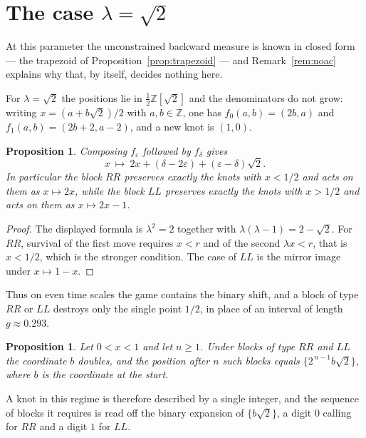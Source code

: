 \documentclass[11pt,reqno]{amsart}
\theoremstyle{plain}
\newtheorem{proposition}[theorem]{Proposition}
\theoremstyle{definition}
\theoremstyle{remark}
\newcommand{\Z}{\mathbb{Z}}
\newcommand{\fp}[1]{\{#1\}}
\begin{document}
\section{\texorpdfstring{The case $\lambda=\sqrt2$}{The case lambda = sqrt 2}}\label{sec:sqrt2}

At this parameter the unconstrained backward measure is known in closed form
--- the trapezoid of Proposition~\ref{prop:trapezoid} --- and
Remark~\ref{rem:noac} explains why that, by itself, decides nothing here.

For $\lambda=\sqrt2$ the positions lie in $\tfrac12\Z[\sqrt2]$ and the
denominators do not grow: writing $x=(a+b\sqrt2)/2$ with $a,b\in\Z$, one has
$f_0(a,b)=(2b,a)$ and $f_1(a,b)=(2b+2,a-2)$, and a new knot is $(1,0)$.

\begin{proposition}\label{prop:blocks}
Composing $f_\varepsilon$ followed by $f_\delta$ gives
\[
  x\ \longmapsto\ 2x+(\delta-2\varepsilon)+(\varepsilon-\delta)\sqrt2 .
\]
In particular the block $RR$ preserves exactly the knots with $x<1/2$ and acts
on them as $x\mapsto2x$, while the block $LL$ preserves exactly the knots with
$x>1/2$ and acts on them as $x\mapsto2x-1$.
\end{proposition}

\begin{proof}
The displayed formula is $\lambda^2=2$ together with
$\lambda(\lambda-1)=2-\sqrt2$. For $RR$, survival of the first move requires
$x<r$ and of the second $\lambda x<r$, that is $x<1/2$, which is the stronger
condition. The case of $LL$ is the mirror image under $x\mapsto1-x$.
\end{proof}

Thus on even time scales the game contains the binary shift, and a block of type
$RR$ or $LL$ destroys only the single point $1/2$, in place of an interval of
length $g\approx0.293$.

\begin{proposition}\label{prop:closed}
Let $0<x<1$ and let $n\geq1$. Under blocks of type $RR$ and $LL$ the coordinate
$b$ doubles, and the position after $n$ such blocks equals
$\fp{2^{\,n-1}b\sqrt2}$, where $b$ is the coordinate at the start.
\end{proposition}

A knot in this regime is therefore described by a single integer, and the
sequence of blocks it requires is read off the binary expansion of
$\fp{b\sqrt2}$, a digit $0$ calling for $RR$ and a digit $1$ for $LL$.
\end{document}
